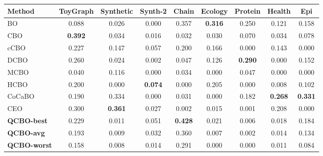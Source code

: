 \begin{tabular}{@{}lcccccccc@{}}
\toprule
\textbf{Method} & ToyGraph & Synthetic & Synth-2 & Chain & Ecology & Protein & Health & Epi \\
\midrule
BO & 0.088 & 0.026 & 0.000 & 0.357 & \textbf{0.316} & 0.250 & 0.121 & 0.158 \\
CBO & \textbf{0.392} & 0.034 & 0.016 & 0.032 & 0.030 & 0.070 & 0.034 & 0.078 \\
cCBO & 0.227 & 0.147 & 0.057 & 0.200 & 0.166 & 0.000 & 0.143 & 0.000 \\
DCBO & 0.260 & 0.024 & 0.002 & 0.047 & 0.126 & \textbf{0.290} & 0.000 & 0.152 \\
MCBO & 0.040 & 0.116 & 0.000 & 0.034 & 0.000 & 0.047 & 0.000 & 0.000 \\
HCBO & 0.200 & 0.000 & \textbf{0.074} & 0.000 & 0.205 & 0.000 & 0.008 & 0.102 \\
CoCaBO & 0.190 & 0.334 & 0.000 & 0.031 & 0.000 & 0.182 & \textbf{0.268} & \textbf{0.331} \\
CEO & 0.300 & \textbf{0.361} & 0.027 & 0.002 & 0.015 & 0.001 & 0.208 & 0.000 \\
\midrule
\textbf{QCBO-best} & 0.229 & 0.011 & 0.051 & \textbf{0.428} & 0.021 & 0.006 & 0.018 & 0.184 \\
\textbf{QCBO-avg} & 0.193 & 0.009 & 0.032 & 0.360 & 0.007 & 0.002 & 0.014 & 0.134 \\
\textbf{QCBO-worst} & 0.158 & 0.008 & 0.014 & 0.291 & 0.000 & 0.000 & 0.011 & 0.084 \\
\bottomrule
\end{tabular}
